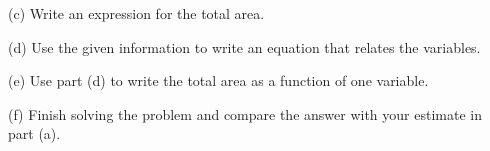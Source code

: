 \documentclass{sebase}
\begin{document}
\begin{multicols}{2}
\begin{ExerciseList}
\begin{ExerciseList}
%

\item[(c)] Write an expression for the total area.

%

%

\item[(d)] Use the given information to write an equation that relates the
variables.

%

%

\item[(e)] Use part (d) to write the total area as a function of one
variable.

%

%

\item[(f)] Finish solving the problem and compare the answer with your
estimate in part (a).

%

%
\end{ExerciseList}


\end{ExerciseList}
\end{multicols}
\end{document}
